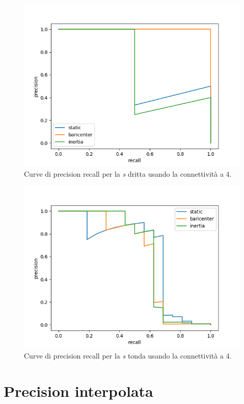 \begin{figure}
    \centering
    \includegraphics[width=.9\textwidth]{figures/graphs/S_drittaFalse.png}
    \caption{Curve di precision recall per la \emph{s} dritta usando la connettivit\`a a 4.}
    \label{fig:graph_S_dritta}
\end{figure}

\begin{figure}
    \centering
    \includegraphics[width=.9\textwidth]{figures/graphs/S_tondaFalse.png}
    \caption{Curve di precision recall per la \emph{s} tonda usando la connettivit\`a a 4.}
    \label{fig:graph_S_tonda}
\end{figure}

\section{Precision interpolata}

